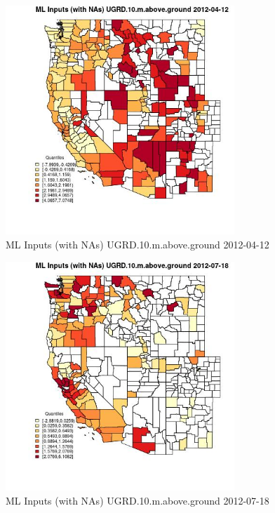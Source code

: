 \begin{figure} 
\centering  
\includegraphics[width=0.77\textwidth]{Code_Outputs/Report_ML_input_PM25_Step4_part_e_de_duplicated_aves_compiled_2019-05-14wNAs_CountyUGRD10mabovegroundMean2012-04-12_2012-04-12.jpg} 
\caption{\label{fig:Report_ML_input_PM25_Step4_part_e_de_duplicated_aves_compiled_2019-05-14wNAsCountyUGRD10mabovegroundMean2012-04-12_2012-04-12}ML Inputs (with NAs) UGRD.10.m.above.ground 2012-04-12} 
\end{figure} 
 

\begin{figure} 
\centering  
\includegraphics[width=0.77\textwidth]{Code_Outputs/Report_ML_input_PM25_Step4_part_e_de_duplicated_aves_compiled_2019-05-14wNAs_CountyUGRD10mabovegroundMean2012-07-18_2012-07-18.jpg} 
\caption{\label{fig:Report_ML_input_PM25_Step4_part_e_de_duplicated_aves_compiled_2019-05-14wNAsCountyUGRD10mabovegroundMean2012-07-18_2012-07-18}ML Inputs (with NAs) UGRD.10.m.above.ground 2012-07-18} 
\end{figure} 
 


